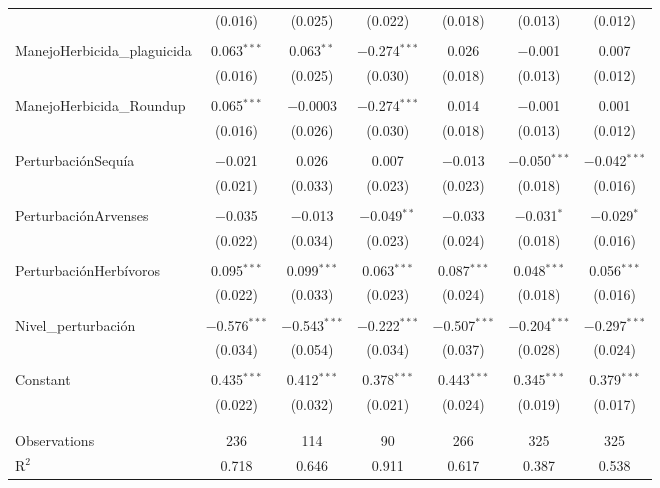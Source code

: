 \documentclass[spanish,11pt]{article}
\begin{document}
\begin{table}[!htbp]
\begin{tabular}{@{\extracolsep{5pt}}lcccccc}
  & (0.016) & (0.025) & (0.022) & (0.018) & (0.013) & (0.012) \\ 
  & & & & & & \\ 
 ManejoHerbicida\_plaguicida & 0.063$^{***}$ & 0.063$^{**}$ & $-$0.274$^{***}$ & 0.026 & $-$0.001 & 0.007 \\ 
  & (0.016) & (0.025) & (0.030) & (0.018) & (0.013) & (0.012) \\ 
  & & & & & & \\ 
 ManejoHerbicida\_Roundup & 0.065$^{***}$ & $-$0.0003 & $-$0.274$^{***}$ & 0.014 & $-$0.001 & 0.001 \\ 
  & (0.016) & (0.026) & (0.030) & (0.018) & (0.013) & (0.012) \\ 
  & & & & & & \\ 
 PerturbaciónSequía & $-$0.021 & 0.026 & 0.007 & $-$0.013 & $-$0.050$^{***}$ & $-$0.042$^{***}$ \\ 
  & (0.021) & (0.033) & (0.023) & (0.023) & (0.018) & (0.016) \\ 
  & & & & & & \\ 
 PerturbaciónArvenses & $-$0.035 & $-$0.013 & $-$0.049$^{**}$ & $-$0.033 & $-$0.031$^{*}$ & $-$0.029$^{*}$ \\ 
  & (0.022) & (0.034) & (0.023) & (0.024) & (0.018) & (0.016) \\ 
  & & & & & & \\ 
 PerturbaciónHerbívoros & 0.095$^{***}$ & 0.099$^{***}$ & 0.063$^{***}$ & 0.087$^{***}$ & 0.048$^{***}$ & 0.056$^{***}$ \\ 
  & (0.022) & (0.033) & (0.023) & (0.024) & (0.018) & (0.016) \\ 
  & & & & & & \\ 
 Nivel\_perturbación & $-$0.576$^{***}$ & $-$0.543$^{***}$ & $-$0.222$^{***}$ & $-$0.507$^{***}$ & $-$0.204$^{***}$ & $-$0.297$^{***}$ \\ 
  & (0.034) & (0.054) & (0.034) & (0.037) & (0.028) & (0.024) \\ 
  & & & & & & \\ 
 Constant & 0.435$^{***}$ & 0.412$^{***}$ & 0.378$^{***}$ & 0.443$^{***}$ & 0.345$^{***}$ & 0.379$^{***}$ \\ 
  & (0.022) & (0.032) & (0.021) & (0.024) & (0.019) & (0.017) \\ 
  & & & & & & \\ 
\hline \\[-1.8ex] 
Observations & 236 & 114 & 90 & 266 & 325 & 325 \\ 
R$^{2}$ & 0.718 & 0.646 & 0.911 & 0.617 & 0.387 & 0.538 \\ 

\end{tabular}
\end{table}
\end{document}
